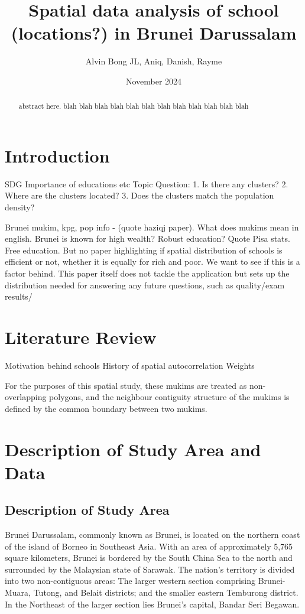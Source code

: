 \documentclass [12 pt]{article}
\title{Spatial data analysis of school (locations?) in Brunei Darussalam }
\author{Alvin Bong JL, Aniq, Danish, Rayme}
\date{November 2024}
\begin{document}
\maketitle
\begin{abstract}
    abstract here. blah blah blah blah blah blah blah blah blah blah blah blah
\end{abstract}
\section{Introduction}
SDG
Importance of educations etc
Topic Question:
	1. Is there any clusters?
	2. Where are the clusters located?
	3. Does the clusters match the population density?

Brunei mukim, kpg, pop info -  (quote haziqj paper). What does mukims mean in english.
Brunei is known for high wealth? Robust education? Quote Pisa stats. Free education. But no paper highlighting if spatial distribution of schools is efficient or not, whether it is equally for rich and poor. We want to see if this is a factor behind. This paper itself does not tackle the application but sets up the distribution needed for answering any future questions, such as quality/exam results/

\section{Literature Review}
Motivation behind schools
History of spatial autocorrelation
Weights

For the purposes of this spatial study, these
 mukims are treated as non-overlapping polygons, and the neighbour contiguity structure
 of the mukims is defined by the common boundary between two mukims.

\section{Description of Study Area and Data}
\subsection{Description of Study Area}
Brunei Darussalam, commonly known as Brunei, is located on the northern coast of the island of Borneo in Southeast Asia. With an area of approximately 5,765 square kilometers, Brunei is bordered by the South China Sea to the north and surrounded by the Malaysian state of Sarawak. The nation’s territory is divided into two non-contiguous areas:  The larger western section comprising Brunei-Muara, Tutong, and Belait districts; and the smaller eastern Temburong district. In the Northeast of the larger section lies Brunei's capital, Bandar Seri Begawan. \\
\end{document}
